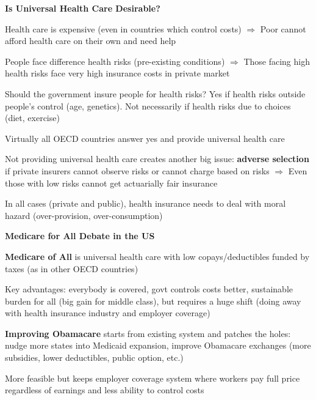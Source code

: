 \documentclass[landscape]{slides}
\begin{document}
\begin{slide}
\begin{center}
{\bf Is Universal Health Care Desirable?}
\end{center}
Health care is expensive (even in countries which control costs) $\Rightarrow$ Poor cannot afford health care on their own and need help

People face difference health risks (pre-existing conditions)
$\Rightarrow$ Those facing high health risks face very high insurance
costs in private market

Should the government insure people for health risks? Yes if health risks outside people's control (age, genetics).
Not necessarily if health risks due to choices (diet, exercise)

Virtually all OECD countries answer yes and provide universal
health care

\small

Not providing universal health care creates another big issue: \textbf{adverse selection} if private insurers cannot observe risks
or cannot charge based on risks $\Rightarrow$ Even those with low risks cannot get actuarially fair insurance

In all cases (private and public), health insurance needs to deal with moral hazard (over-provision, over-consumption)

\end{slide}

\begin{slide}
\begin{center}
{\bf Medicare for All Debate in the US}
\end{center}

\textbf{Medicare of All} is universal health care with low copays/deductibles funded by taxes (as in other OECD countries)

Key advantages: everybody is covered, govt controls costs better, sustainable burden for all (big gain for middle class),
but requires a huge shift (doing away with health insurance industry and employer coverage)

\textbf{Improving Obamacare} starts from existing system and patches the holes: nudge more states into Medicaid expansion,
improve Obamacare exchanges (more subsidies, lower deductibles, public option, etc.)

More feasible but keeps employer coverage system where workers pay full price regardless of earnings and
less ability to control costs

\end{slide}
\end{document}
